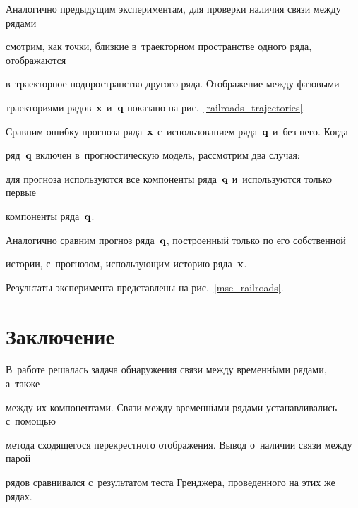Аналогично предыдущим экспериментам, для проверки наличия связи между рядами 

смотрим, как точки, близкие в~траекторном пространстве одного ряда, отображаются 

в~траекторное подпространство другого ряда. Отображение между фазовыми 

траекториями рядов~$\mathbf{x}$ и~$\mathbf{q}$ показано на рис.~\ref{railroads_trajectories}.











Сравним ошибку прогноза ряда~$\mathbf{x}$ с~использованием ряда~$\mathbf{q}$ и~без него. Когда 

ряд~$\mathbf{q}$  включен в~прогностическую модель, рассмотрим два случая:

для прогноза используются  все компоненты ряда~$\mathbf{q}$ и~используются только первые 

компоненты ряда~$\mathbf{q}$.

Аналогично сравним прогноз ряда~$\mathbf{q}$, построенный только по его собственной 

истории, с~прогнозом, использующим историю ряда~$\mathbf{x}$.

Результаты эксперимента представлены на рис.~\ref{mse_railroads}.









\section{Заключение}



В~работе решалась задача обнаружения связи между временн$\acute{\mbox{ы}}$ми рядами, а~также 

между их компонентами. Связи между  временн$\acute{\mbox{ы}}$ми рядами уста\-нав\-л\-ива\-лись с~по\-мощью 

метода сходящегося перекрестного отображения. Вывод о~наличии связи между парой 

рядов сравнивался с~результатом теста Гренджера, проведенного на этих же рядах.




